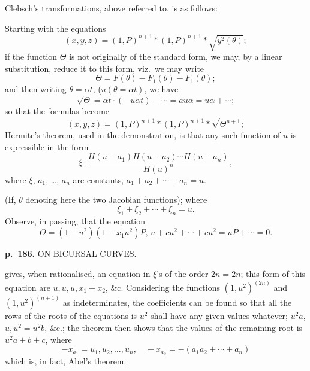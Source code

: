 \documentclass[11pt,a4paper]{article}
\begin{document}
Clebsch's transformations, above referred to, is as follows:

Starting with the equations
\[
(x, y, z) = (1, P)^{n+1} \ast (1, P)^{n+1} \ast \sqrt{y^2(\theta)};
\]
if the function $\Theta$ is not originally of the standard form, we may, by a linear substitution, reduce it to this form, viz.\ we may write
\[
\Theta = F(\theta) - F_1(\theta) - F_1(\theta);
\]
and then writing $\theta = \alpha t$, ($u(\theta = \alpha t)$, we have
\[
\sqrt{\Theta} = \alpha t \cdot (-u \alpha t) - \cdots = a u \alpha = u \alpha + \cdots;
\]
so that the formulas become
\[
(x, y, z) = (1, P)^{n+1} \ast (1, P)^{n+1} \ast \sqrt{\Theta^{n+1}};
\]
Hermite's theorem, used in the demonstration, is that any such function of $u$ is expressible in the form
\[
\xi \cdot \frac{H(u - a_1) H(u - a_2) \cdots H(u - a_n)}{H(u)^n},
\]
where $\xi$, $a_1$, \ldots, $a_n$ are constants, $a_1 + a_2 + \cdots + a_n = u$.

(If, $\theta$ denoting here the two Jacobian functions); where
\[
\xi_1 + \xi_2 + \cdots + \xi_n = u.
\]
Observe, in passing, that the equation
\[
\Theta = (1 - u^2)(1 - x_1 u^2)P, \, u + c u^2 + \cdots + c u^2 = u P + \cdots = 0.
\]

\clearpage

\noindent
\textbf{p.~186.}  ON BICURSAL CURVES.

gives, when rationalised, an equation in $\xi$'s of the order $2n = 2n$; this form of this equation are $u, u, u, x_1 + x_2$, \&c.  Considering the functions $(1, u^2)^{(2n)}$ and $(1, u^2)^{(n+1)}$ as indeterminates, the coefficients can be found so that all the rows of the roots of the equations is $u^2$ shall have any given values whatever; $u^2 a$, $u, u^2 = u^2 b$, \&c.; the theorem then shows that the values of the remaining root is $u^2 a + b + c$, where
\[
-x_{a_1} = u_1, u_2, \ldots, u_n, \quad -x_{a_2} = -(a_1 a_2 + \cdots + a_n)
\]
which is, in fact, Abel's theorem.
\end{document}
